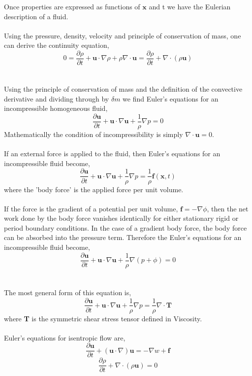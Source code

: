 \documentclass[12pt]{article}
\begin{document}
\begin{flushleft}
Once properties are expressed as functions of $\textbf{x}$ and t we have the Eulerian description of a fluid.
\\~\\
Using the pressure, density, velocity and principle of conservation of mass, one can derive the continuity equation,
$$0 = \frac{\partial \rho}{\partial t} + \textbf{u}\cdot\nabla \rho + \rho\nabla\cdot\textbf{u} = \frac{\partial \rho}{\partial t} + \nabla \cdot (\rho\textbf{u})$$
\\~\\
Using the principle of conservation of mass and the definition of the convective derivative and dividing through by $\delta m$ we find Euler's equations for an incompressible homogeneous fluid,
$$\frac{\partial \textbf{u}}{\partial t}+\textbf{u}\cdot\nabla \textbf{u} + \frac{1}{\rho}\nabla p= 0$$
Mathematically the condition of incompressibility is simply $\nabla\cdot \textbf{u} = 0$.
\\~\\
If an external force is applied to the fluid, then Euler's equations for an incompressible  fluid become,
$$\frac{\partial \textbf{u}}{\partial t}+\textbf{u}\cdot\nabla \textbf{u}+\frac{1}{\rho}\nabla p = \frac{1}{\rho}\textbf{f}(\textbf{x},t)$$
where the 'body force' is the applied force per unit volume. 
\\~\\
If the force is the gradient of a potential per unit volume, $\textbf{f} = -\nabla \phi$, then the net work done by the body force vanishes identically for either stationary rigid or period boundary conditions. In the case of a gradient body force, the body force can be absorbed into the pressure term. Therefore the Euler's equations for an incompressible fluid become,
$$\frac{\partial \textbf{u}}{\partial t}+\textbf{u}\cdot\nabla \textbf{u}+\frac{1}{\rho}\nabla (p+\phi) = 0$$
\\~\\
The most general form of this equation is,
$$\frac{\partial \textbf{u}}{\partial t}+\textbf{u}\cdot\nabla \textbf{u}+\frac{1}{\rho}\nabla p = \frac{1}{\rho}\nabla \cdot \textbf{T}$$
where \textbf{T} is the symmetric shear stress tensor defined in Viscosity.
\\~\\
Euler's equations for isentropic flow are,
$$\frac{\partial\textbf{u}}{\partial t}+(\textbf{u}\cdot\nabla)\textbf{u} = -\nabla w+\textbf{f}$$
$$\frac{\partial \rho}{\partial t}+\nabla\cdot(\rho\textbf{u}) = 0$$
\end{flushleft}
\end{document}
